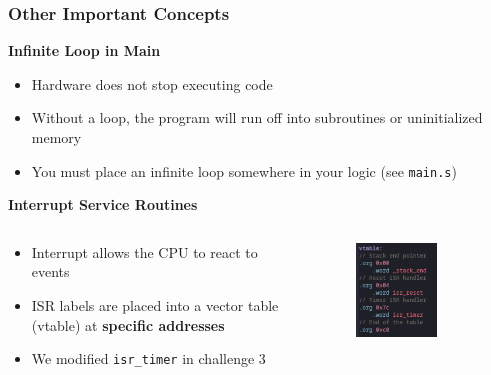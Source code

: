 \documentclass{beamer}
\begin{document}
\begin{frame}
    \frametitle{Other Important Concepts}
	\textbf{Infinite Loop in Main}
    \begin{itemize}
		\item Hardware does not stop executing code
		\item Without a loop, the program will run off into subroutines or uninitialized memory
		\item You must place an infinite loop somewhere in your logic (see \texttt{main.s})
    \end{itemize}
	\textbf{Interrupt Service Routines}
    \begin{columns}
        \begin{column}{0.55\textwidth}
			\begin{itemize}
				\item Interrupt allows the CPU to react to events
				\item ISR labels are placed into a vector table (vtable) at \textbf{specific addresses}
				\item We modified \texttt{isr\_timer} in challenge 3
			\end{itemize}
        \end{column}
        \begin{column}{0.4\textwidth}
			\begin{figure}
				\centering
				\includegraphics[width=0.7\textwidth]{images/vtable.png}
			\end{figure}
        \end{column}
    \end{columns}
\end{frame}
\end{document}
